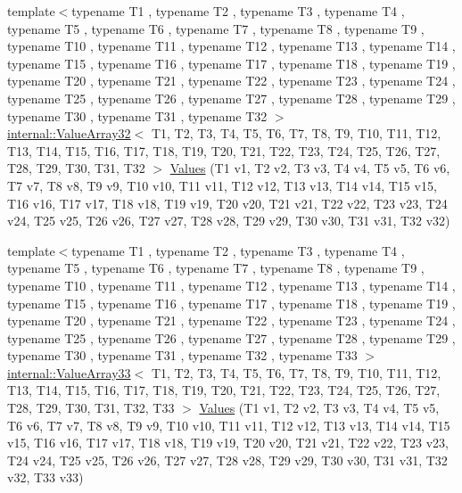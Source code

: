 \begin{DoxyCompactItemize}
{\footnotesize template$<$typename T1 , typename T2 , typename T3 , typename T4 , typename T5 , typename T6 , typename T7 , typename T8 , typename T9 , typename T10 , typename T11 , typename T12 , typename T13 , typename T14 , typename T15 , typename T16 , typename T17 , typename T18 , typename T19 , typename T20 , typename T21 , typename T22 , typename T23 , typename T24 , typename T25 , typename T26 , typename T27 , typename T28 , typename T29 , typename T30 , typename T31 , typename T32 $>$ }\\\mbox{\hyperlink{classtesting_1_1internal_1_1_value_array32}{internal\+::\+Value\+Array32}}$<$ T1, T2, T3, T4, T5, T6, T7, T8, T9, T10, T11, T12, T13, T14, T15, T16, T17, T18, T19, T20, T21, T22, T23, T24, T25, T26, T27, T28, T29, T30, T31, T32 $>$ \mbox{\hyperlink{namespacetesting_afeff614d4c808c753bbfa208409ad664}{Values}} (T1 v1, T2 v2, T3 v3, T4 v4, T5 v5, T6 v6, T7 v7, T8 v8, T9 v9, T10 v10, T11 v11, T12 v12, T13 v13, T14 v14, T15 v15, T16 v16, T17 v17, T18 v18, T19 v19, T20 v20, T21 v21, T22 v22, T23 v23, T24 v24, T25 v25, T26 v26, T27 v27, T28 v28, T29 v29, T30 v30, T31 v31, T32 v32)
\item 
{\footnotesize template$<$typename T1 , typename T2 , typename T3 , typename T4 , typename T5 , typename T6 , typename T7 , typename T8 , typename T9 , typename T10 , typename T11 , typename T12 , typename T13 , typename T14 , typename T15 , typename T16 , typename T17 , typename T18 , typename T19 , typename T20 , typename T21 , typename T22 , typename T23 , typename T24 , typename T25 , typename T26 , typename T27 , typename T28 , typename T29 , typename T30 , typename T31 , typename T32 , typename T33 $>$ }\\\mbox{\hyperlink{classtesting_1_1internal_1_1_value_array33}{internal\+::\+Value\+Array33}}$<$ T1, T2, T3, T4, T5, T6, T7, T8, T9, T10, T11, T12, T13, T14, T15, T16, T17, T18, T19, T20, T21, T22, T23, T24, T25, T26, T27, T28, T29, T30, T31, T32, T33 $>$ \mbox{\hyperlink{namespacetesting_ac972228f2ff86974ab6591a10512326a}{Values}} (T1 v1, T2 v2, T3 v3, T4 v4, T5 v5, T6 v6, T7 v7, T8 v8, T9 v9, T10 v10, T11 v11, T12 v12, T13 v13, T14 v14, T15 v15, T16 v16, T17 v17, T18 v18, T19 v19, T20 v20, T21 v21, T22 v22, T23 v23, T24 v24, T25 v25, T26 v26, T27 v27, T28 v28, T29 v29, T30 v30, T31 v31, T32 v32, T33 v33)
\item 

\end{DoxyCompactItemize}
